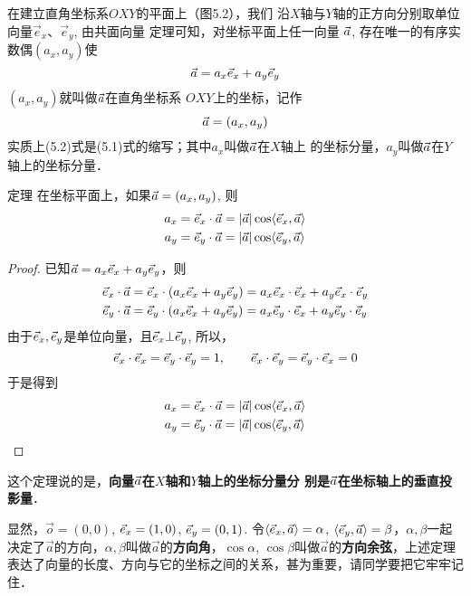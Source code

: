 在建立直角坐标系$OXY$的平面上（图5.2），我们
沿$X$轴与$Y$轴的正方向分别取单位向量$\vec{e}_x$、$\vec{e}_y$, 由共面向量
定理可知，对坐标平面上任一向量
$\vec{a}$, 存在唯一的有序实数偶$(a_x,a_y)$使
\begin{equation}
    \vec{a} =a_x \vec{e}_x+a_y \vec{e}_y
\end{equation}
$(a_x,a_y)$就叫做$\vec{a}$在直角坐标系
$OXY$上的坐标，记作
\begin{equation}
    \vec{a}=(a_x,a_y)
\end{equation}
实质上(5.2)式是(5.1)式的缩写；其中$a_x$叫做$\vec{a}$在$X$轴上
的坐标分量，$a_y$叫做$\vec{a}$在$Y$轴上的坐标分量．

\begin{blk}
    {定理} 在坐标平面上，如果$\vec{a}=(a_x,a_y)$, 则
    \begin{equation}
    \begin{split}
        a_x&=\vec{e}_x\cdot \vec{a}=|\vec{a}|\cos\langle\vec{e}_x,\vec{a}\rangle\\
        a_y&=\vec{e}_y\cdot \vec{a}=|\vec{a}|\cos\langle\vec{e}_y,\vec{a}\rangle\\
    \end{split}
    \end{equation}
\end{blk}

\begin{proof}
    已知$\vec{a} =a_x \vec{e}_x+a_y \vec{e}_y$，则
\[\begin{split}
   \vec{e}_x\cdot \vec{a}&=\vec{e}_x\cdot (a_x\vec{e}_x+a_y\vec{e}_y)=a_x\vec{e}_x\cdot \vec{e}_x+a_y\vec{e}_x\cdot \vec{e}_y\\
   \vec{e}_y\cdot \vec{a}&=\vec{e}_y\cdot (a_x\vec{e}_x+a_y\vec{e}_y)=a_x\vec{e}_y\cdot \vec{e}_x+a_y\vec{e}_y\cdot \vec{e}_y\\ 
\end{split}\]
由于$\vec{e}_x,\vec{e}_y$是单位向量，且$\vec{e}_x\bot \vec{e}_y$, 所以，
\[\vec{e}_x\cdot \vec{e}_x=\vec{e}_y\cdot \vec{e}_y=1,\qquad \vec{e}_x\cdot \vec{e}_y=\vec{e}_y\cdot \vec{e}_x=0\]
于是得到
\[    \begin{split}
    a_x&=\vec{e}_x\cdot \vec{a}=|\vec{a}|\cos\langle\vec{e}_x,\vec{a}\rangle\\
    a_y&=\vec{e}_y\cdot \vec{a}=|\vec{a}|\cos\langle\vec{e}_y,\vec{a}\rangle\\
\end{split}\]
\end{proof}

这个定理说的是，\textbf{向量$\vec{a}$在$X$轴和$Y$轴上的坐标分量分
别是$\vec{a}$在坐标轴上的垂直投影量}．

显然，$\vec{o}=(0, 0)$, $\vec{e}_x=(1, 0)$, $\vec{e}_y=(0, 1)$. 令$\left\langle \vec{e}_x,\vec{a} \right\rangle=\alpha$, $\left\langle \vec{e}_y,\vec{a} \right\rangle=\beta$，$\alpha,\beta$一起决定了$\vec{a}$的方向，$\alpha,\beta$叫做$\vec{a}$的\textbf{方向角}，$\cos\alpha$, $\cos\beta$叫做$\vec{a}$的\textbf{方向余弦}，上述定理表达了向量的长度、方向与它的坐标之间的关系，甚为重要，请同学要把它牢牢记住．

